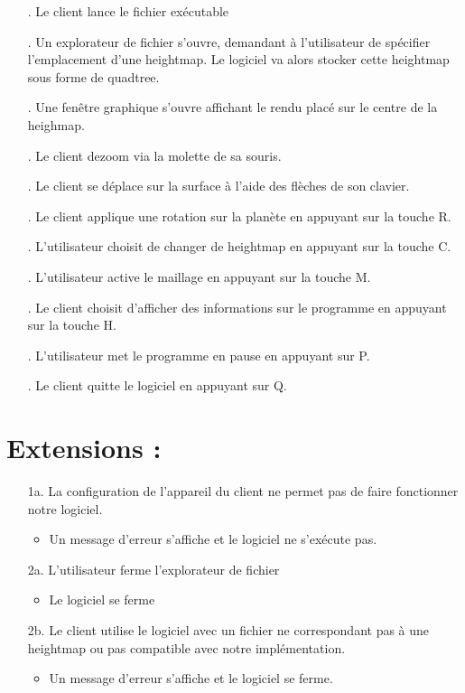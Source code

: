 \documentclass[12pt]{report}
\begin{document}
\begin{enumerate}

\item[\sffamily 1.] Le client lance le fichier exécutable 
\item[\sffamily 2.] Un explorateur de fichier s'ouvre, demandant à l'utilisateur de spécifier l'emplacement d'une heightmap. Le logiciel va alors stocker cette heightmap sous forme de quadtree.
\item[\sffamily 3.] Une fenêtre graphique s'ouvre affichant le rendu placé sur le centre de la heighmap.
\item[\sffamily 4.] Le client dezoom via la molette de sa souris.
\item[\sffamily 5.] Le client se déplace sur la surface à l'aide des flèches de son clavier. 
\item[\sffamily 6.] Le client applique une rotation sur la planète en appuyant sur la touche R.
\item[\sffamily 7.] L'utilisateur choisit de changer de heightmap en appuyant sur la touche C.
\item[\sffamily 8.] L'utilisateur active le maillage en appuyant sur la touche M.
\item[\sffamily 9.] Le client choisit d'afficher des informations sur le programme en appuyant sur la touche H.
\item[\sffamily 10.] L'utilisateur met le programme en pause en appuyant sur P.
\item[\sffamily 11.] Le client quitte le logiciel en appuyant sur Q.



\end{enumerate}

\section{Extensions :}

\begin{enumerate}

\item[\sffamily 1a.] La configuration de l'appareil du client ne permet pas de  faire fonctionner notre logiciel.
\begin{itemize}
    \item Un message d'erreur s'affiche et le logiciel ne s'exécute pas.
\end{itemize}
\item[\sffamily 2a.] L'utilisateur ferme l'explorateur de fichier
\begin{itemize}
    \item Le logiciel se ferme
\end{itemize}
\item[\sffamily 2b.] Le client utilise le logiciel avec un fichier ne correspondant pas à une heightmap ou pas compatible avec notre implémentation.
\begin{itemize}
    \item Un message d'erreur s'affiche et le logiciel se ferme.
\end{itemize}

\end{enumerate}
\end{document}
